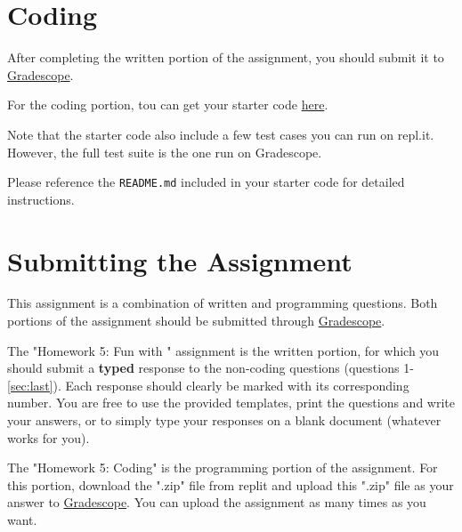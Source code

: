 \documentclass [12pt]{article}
\begin{document}
\section{Coding }
After completing the written portion of the assignment, you should submit it to \href{https://www.gradescope.com/courses/350304}{Gradescope}.

For the coding portion, tou can get your starter code \href{https://replit.com/team/COMP285/HW5-Code}{here}.

Note that the starter code also include a few test cases you can run on repl.it. However, the full test suite is the one run on Gradescope.

Please reference the \texttt{README.md} included in your starter code for detailed instructions.

\section*{Submitting the Assignment}

This assignment is a combination of written and programming questions. Both portions of the assignment should be submitted through \href{https://www.gradescope.com/courses/350304}{Gradescope}.

The "Homework 5: Fun with " assignment is the written portion, for which you should submit a \textbf{typed} response to the non-coding questions (questions 1-\ref{sec:last}). Each response should clearly be marked with its corresponding number. You are free to use the provided templates, print the questions and write your answers, or to simply type your responses on a blank document (whatever works for you).

The "Homework 5: Coding" is the programming portion of the assignment. For this portion, download the ".zip" file from replit and upload this ".zip" file as your answer to \href{https://www.gradescope.com/courses/350304}{Gradescope}. You can upload the assignment as many times as you want.
\end{document}
